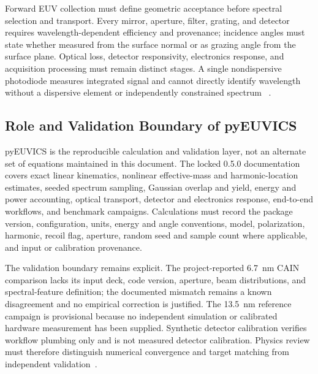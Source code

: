 Forward EUV collection must define geometric acceptance before spectral
selection and transport. Every mirror, aperture, filter, grating, and detector
requires wavelength-dependent efficiency and provenance; incidence angles must
state whether measured from the surface normal or as grazing angle from the
surface plane. Optical loss, detector responsivity, electronics response, and
acquisition processing must remain distinct stages. A single nondispersive
photodiode measures integrated signal and cannot directly identify wavelength
without a dispersive element or independently constrained spectrum
~\cite{pyEUVICSInstrumentation050}.

\subsection{Role and Validation Boundary of pyEUVICS}

pyEUVICS is the reproducible calculation and validation layer, not an alternate
set of equations maintained in this document. The locked 0.5.0 documentation
covers exact linear kinematics, nonlinear effective-mass and harmonic-location
estimates, seeded spectrum sampling, Gaussian overlap and yield, energy and
power accounting, optical transport, detector and electronics response,
end-to-end workflows, and benchmark campaigns. Calculations must record the
package version, configuration, units, energy and angle conventions, model,
polarization, harmonic, recoil flag, aperture, random seed and sample count
where applicable, and input or calibration provenance.

The validation boundary remains explicit. The project-reported 6.7~nm CAIN
comparison lacks its input deck, code version, aperture, beam distributions, and
spectral-feature definition; the documented mismatch remains a known
disagreement and no empirical correction is justified. The 13.5~nm reference
campaign is provisional because no independent simulation or calibrated
hardware measurement has been supplied. Synthetic detector calibration verifies
workflow plumbing only and is not measured detector calibration. Physics review
must therefore distinguish numerical convergence and target matching from
independent validation~\cite{pyEUVICSValidation050}.

\blankline
\blankline
